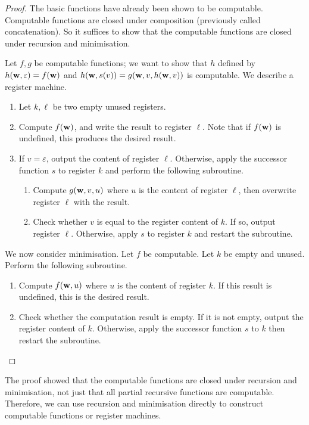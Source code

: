 \begin{proof}
	The basic functions have already been shown to be computable.
	Computable functions are closed under composition (previously called concatenation).
	So it suffices to show that the computable functions are closed under recursion and minimisation.

	Let \( f, g \) be computable functions; we want to show that \( h \) defined by \( h(\vb w, \varepsilon) = f(\vb w) \) and \( h(\vb w, s(v)) = g(\vb w, v, h(\vb w, v)) \) is computable.
	We describe a register machine.
	\begin{enumerate}
		\item Let \( k, \ell \) be two empty unused registers.
		\item Compute \( f(\vb w) \), and write the result to register \( \ell \).
			Note that if \( f(\vb w) \) is undefined, this produces the desired result.
		\item If \( v = \varepsilon \), output the content of register \( \ell \).
			Otherwise, apply the successor function \( s \) to register \( k \) and perform the following subroutine.
			\begin{enumerate}
				\item Compute \( g(\vb w, v, u) \) where \( u \) is the content of register \( \ell \), then overwrite register \( \ell \) with the result.
				\item Check whether \( v \) is equal to the register content of \( k \).
					If so, output register \( \ell \).
					Otherwise, apply \( s \) to register \( k \) and restart the subroutine.
			\end{enumerate}
	\end{enumerate}
	We now consider minimisation.
	Let \( f \) be computable.
	Let \( k \) be empty and unused.
	Perform the following subroutine.
	\begin{enumerate}
		\item Compute \( f(\vb w, u) \) where \( u \) is the content of register \( k \).
			If this result is undefined, this is the desired result.
		\item Check whether the computation result is empty.
			If it is not empty, output the register content of \( k \).
			Otherwise, apply the successor function \( s \) to \( k \) then restart the subroutine.
	\end{enumerate}
\end{proof}
\begin{remark}
	The proof showed that the computable functions are closed under recursion and minimisation, not just that all partial recursive functions are computable.
	Therefore, we can use recursion and minimisation directly to construct computable functions or register machines.
\end{remark}
